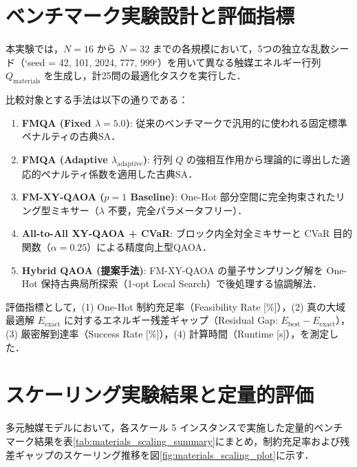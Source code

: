 \documentclass[11pt,a4paper]{ltjsarticle}
\begin{document}
\section{ベンチマーク実験設計と評価指標}
\label{sec:benchmark_design}
本実験では，$N=16$ から $N=32$ までの各規模において，5つの独立な乱数シード（`seed = 42, 101, 2024, 777, 999`）を用いて異なる触媒エネルギー行列 $Q_{\mathrm{materials}}$ を生成し，計25問の最適化タスクを実行した．

比較対象とする手法は以下の通りである：
\begin{enumerate}\setlength{\itemsep}{1.5pt}
    \item \textbf{FMQA (Fixed $\lambda=5.0$)}: 従来のベンチマークで汎用的に使われる固定標準ペナルティの古典SA．
    \item \textbf{FMQA (Adaptive $\lambda_{\mathrm{adaptive}}$)}: 行列 $Q$ の強相互作用から理論的に導出した適応的ペナルティ係数を適用した古典SA．
    \item \textbf{FM-XY-QAOA ($p=1$ Baseline)}: One-Hot 部分空間に完全拘束されたリング型ミキサー（$\lambda$ 不要，完全パラメータフリー）．
    \item \textbf{All-to-All XY-QAOA + CVaR}: ブロック内全対全ミキサーと CVaR 目的関数（$\alpha=0.25$）による精度向上型QAOA．
    \item \textbf{Hybrid QAOA (提案手法)}: FM-XY-QAOA の量子サンプリング解を One-Hot 保持古典局所探索（1-opt Local Search）で後処理する協調解法．
\end{enumerate}

評価指標として，(1) One-Hot 制約充足率（Feasibility Rate [\%]），(2) 真の大域最適解 $E_{\mathrm{exact}}$ に対するエネルギー残差ギャップ（Residual Gap: $E_{\mathrm{best}} - E_{\mathrm{exact}}$），(3) 厳密解到達率（Success Rate [\%]），(4) 計算時間（Runtime [s]），を測定した．

\section{スケーリング実験結果と定量的評価}
\label{sec:results}
多元触媒モデルにおいて，各スケール 5 インスタンスで実施した定量的ベンチマーク結果を表\ref{tab:materials_scaling_summary}にまとめ，制約充足率および残差ギャップのスケーリング推移を図\ref{fig:materials_scaling_plot}に示す．
\end{document}
